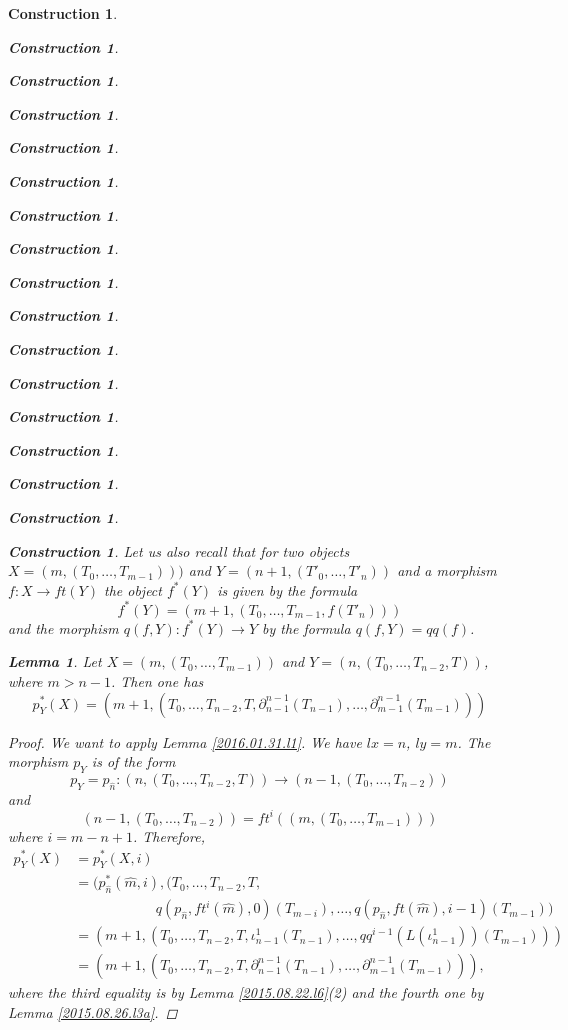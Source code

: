 \documentclass[12pt]{amsart}
\newtheorem{lemma}[proposition]{Lemma}
\numberwithin{proposition}{subsection}
\newtheorem{construction}[proposition]{Construction}
\newcommand{\llabel}[1]{\label{#1}}
\newcommand{\sr}{\rightarrow}
\newcommand{\wh}{\widehat}
\newcommand{\spc}{{\,\,\,\,\,\,\,}}
\begin{document}
\begin{construction}
\begin{construction}
\begin{construction}
\begin{construction}
\begin{construction}
\begin{construction}
\begin{construction}
\begin{construction}
\begin{construction}
\begin{construction}
\begin{construction}
\begin{construction}
\begin{construction}
\begin{construction}
\begin{construction}
\begin{construction}
\begin{construction}
Let us also recall that for two objects $X=(m,(T_0,\dots,T_{m-1})))$ and
$Y=(n+1,(T'_0,\dots,T'_{n}))$ and a morphism $f:X\sr ft(Y)$ the object $f^*(Y)$
is given by the formula
%
\begin{equation}\llabel{2015.09.09.eq3old}
f^*(Y)=(m+1,(T_0,\dots,T_{m-1},f(T'_{n})))
\end{equation}%
%
and the morphism $q(f,Y):f^*(Y)\sr Y$ by the formula $q(f,Y)=qq(f)$. 
% 
\begin{lemma}
\llabel{2015.08.26.l8}
Let $X=(m,(T_0,\dots,T_{m-1}))$ and $Y=(n,(T_0,\dots,T_{n-2},T))$, where $m>n-1$. Then one has
%
$$p_{Y}^*(X)=(m+1,(T_0,\dots,T_{n-2},T,\partial_{n-1}^{n-1}(T_{n-1}),\dots,\partial_{m-1}^{n-1}(T_{m-1})))$$
%
\end{lemma}
%
\begin{proof}
We want to apply Lemma \ref{2016.01.31.l1}. We have $lx=n$, $ly=m$. The morphism $p_Y$ is of the form
%
$$p_Y=p_{\wh{n}}:(n,(T_0,\dots,T_{n-2},T))\sr (n-1,(T_0,\dots,T_{n-2}))$$
%
and 
%
$$(n-1,(T_0,\dots,T_{n-2}))=ft^i((m,(T_0,\dots,T_{m-1})))$$
%
where $i=m-n+1$. Therefore, 
%
\begin{equation*}
  \begin{split}
    p_Y^*(X)&=p_Y^*(X,i)
    \\&=
    (p_{\wh{n}}^*(\wh{m},i), (T_0,\dots,T_{n-2},T,
    \\& \spc\spc\spc\spc\spc
           q(p_{\wh{n}},ft^i(\wh{m}),0)(T_{m-i}),\dots,q(p_{\wh{n}},ft(\wh{m}),i-1)(T_{m-1}))
    \\&=
    (m+1,(T_0,\dots,T_{n-2},T,\iota_{n-1}^1(T_{n-1}),\dots,qq^{i-1}(L(\iota_{n-1}^1))(T_{m-1})))
    \\&=
    (m+1,(T_0,\dots,T_{n-2},T,\partial_{n-1}^{n-1}(T_{n-1}),\dots,\partial_{m-1}^{n-1}(T_{m-1}))),
  \end{split}
\end{equation*}
%
where the third equality is by Lemma \ref{2015.08.22.l6}(2) and the fourth one by Lemma \ref{2015.08.26.l3a}. 
\end{proof}
%


\end{construction}
\end{construction}
\end{construction}
\end{construction}
\end{construction}
\end{construction}
\end{construction}
\end{construction}
\end{construction}
\end{construction}
\end{construction}
\end{construction}
\end{construction}
\end{construction}
\end{construction}
\end{construction}
\end{construction}
\end{document}
